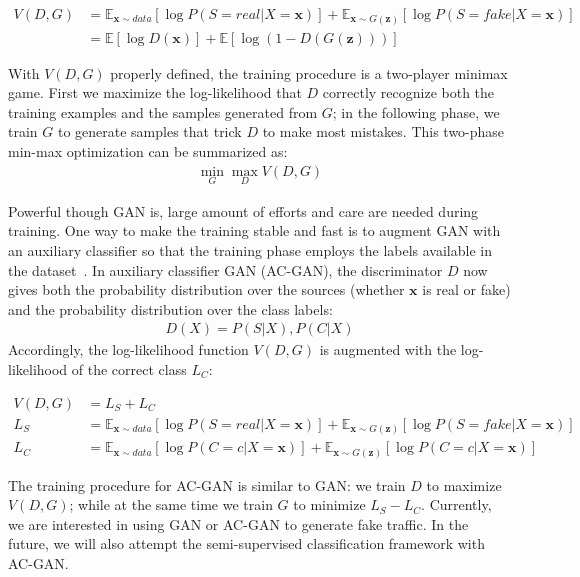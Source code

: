 \begin{align}
    V(D, G) & = \mathbb{E}_{\bm{x}\sim data} [\log P(S=real|X=\bm{x})] + \mathbb{E}_{\bm{x}\sim G(\bm{z})} [\log P(S=fake|X=\bm{x})] \\
        & = \mathbb{E}[\log D(\bm{x})] + \mathbb{E}[\log (1 - D(G(\bm{z})))]
\end{align}

With $V(D, G)$ properly defined, the training procedure is a two-player minimax game.
First we maximize the log-likelihood that $D$ correctly recognize
both the training examples and the samples generated from $G$;
in the following phase, we train $G$ to generate samples that trick $D$ to make most mistakes.
This two-phase min-max optimization can be summarized as:
\begin{align}
    \min_G \max_D V(D, G)
\end{align}

Powerful though GAN is, large amount of efforts and care are needed during training.
One way to make the training stable and fast is to augment GAN with an auxiliary classifier so that
the training phase employs the labels available in the dataset~\cite{AC-GAN}.
In auxiliary classifier GAN (AC-GAN), the discriminator $D$ now gives both the probability
distribution over the sources (whether $\bm{x}$ is real or fake) and the probability distribution
over the class labels:
\begin{align}
    D(X) = P(S|X), P(C|X)
\end{align}
Accordingly, the log-likelihood function $V(D, G)$ is augmented with the log-likelihood of the correct class $L_C$:

\begin{align} 
    V(D, G) &= L_S + L_C \\
    L_S &= \mathbb{E}_{\bm{x} \sim data} [\log P(S=real|X=\bm{x})] + 
    \mathbb{E}_{\bm{x} \sim G(\bm{z})} [\log P(S=fake|X=\bm{x})] \\
    L_C &= \mathbb{E}_{\bm{x} \sim data}[\log P(C=c|X=\bm{x})] + 
    \mathbb{E}_{\bm{x} \sim G(\bm{z})} [\log P(C=c|X=\bm{x})]
\end{align}

The training procedure for AC-GAN is similar to GAN: we train $D$ to maximize $V(D, G)$;
while at the same time we train $G$ to minimize $L_S - L_C$.
Currently, we are interested in using GAN or AC-GAN to generate fake traffic.
In the future, we will also attempt the semi-supervised classification framework with AC-GAN.
\fi

